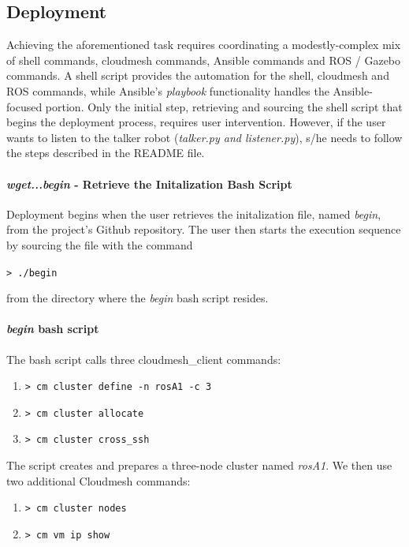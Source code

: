 \documentclass[9pt,twocolumn,twoside]{../../styles/osajnl}
\begin{document}
\subsection{Deployment}
Achieving the aforementioned task requires coordinating a modestly-complex mix of shell commands, cloudmesh commands, Ansible commands and ROS / Gazebo commands. A shell script provides the automation for the shell, cloudmesh and ROS commands, while Ansible's \textit{playbook} functionality handles the Ansible-focused portion.  Only the initial step, retrieving and sourcing the shell script that begins the deployment process, requires user intervention.  However, if the user wants to listen to the talker robot (\textit{talker.py and listener.py}), s/he needs to follow the steps described in the README file.

\paragraph{\textit{wget...begin} - Retrieve the Initalization Bash Script}
Deployment begins when the user retrieves the initalization file, named \textit{begin}, from the project's Github repository.  The user then starts the execution sequence by sourcing the file with the command

{\color{black} \lstinline[style=BashInputStyle]!> ./begin! }

from the directory where the \textit{begin} bash script resides.  

\paragraph{\textit{begin} bash script}
The bash script calls three cloudmesh\_client commands: 

\begin{enumerate}
\setlength\itemsep{-6pt}
\item {\lstinline[style=BashInputStyle]!> cm cluster define -n rosA1 -c 3! }
\item {\lstinline[style=BashInputStyle]!> cm cluster allocate! } 
\item {\lstinline[style=BashInputStyle]!> cm cluster cross_ssh! } 
\end{enumerate}

The script creates and prepares a three-node cluster named \textit{rosA1}.  
We then use two additional Cloudmesh commands:

\begin{enumerate}
\setlength\itemsep{-6pt}
\item  {\lstinline[style=BashInputStyle]!> cm cluster nodes! } 
\item  {\lstinline[style=BashInputStyle]!> cm vm ip show! } 
\end{enumerate}
\end{document}
